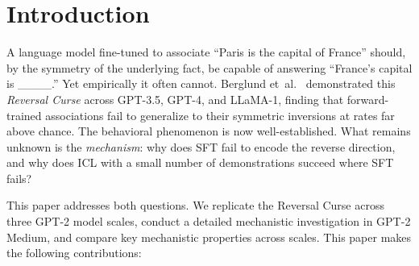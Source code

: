 \documentclass[11pt]{article}
\begin{document}
\begin{abstract}
Cross-scale analysis shows that the causal patching bottleneck occupies the
upper third of layers at every scale. Combined MLP ablation collapses ICL at all
three scales, showing universal MLP dependency. Individual attention head
ablation effects decrease sharply with scale: $-46$~pp in Small, $-20$~pp in
Medium, and effectively $0$~pp in Large---a positive finding suggesting that ICL
routing becomes more redundant as model size increases. Taken together, these
results are consistent with the hypothesis that the Reversal Curse reflects a
failure of the optimization objective rather than an architectural constraint,
and that ICL circumvents it through a routing mechanism whose redundancy
increases with scale.

\end{abstract}

\section{Introduction}

A language model fine-tuned to associate ``Paris is the capital of France''
should, by the symmetry of the underlying fact, be capable of answering
``France's capital is \_\_\_\_.'' Yet empirically it often cannot.
Berglund et~al.~\cite{berglund2023reversal} demonstrated this \emph{Reversal
Curse} across GPT-3.5, GPT-4, and LLaMA-1, finding that forward-trained
associations fail to generalize to their symmetric inversions at rates far above
chance. The behavioral phenomenon is now well-established. What remains unknown
is the \emph{mechanism}: why does SFT fail to encode the reverse direction, and
why does ICL with a small number of demonstrations succeed where SFT fails?

This paper addresses both questions. We replicate the Reversal Curse across
three GPT-2 model scales, conduct a detailed mechanistic investigation in
GPT-2 Medium, and compare key mechanistic properties across scales. This paper
makes the following contributions:
\end{document}
